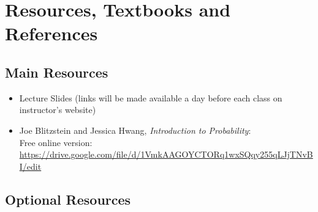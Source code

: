 \documentclass[11pt]{article}
\begin{document}
\section{Resources, Textbooks and References}

\subsection{Main Resources}

\begin{itemize}[leftmargin=*]

    \item Lecture Slides (links will be made available a day before each class on instructor's website)

    \item Joe Blitzstein and Jessica Hwang, 
    \textit{Introduction to Probability}:\\
    Free online version:\\
    \url{https://drive.google.com/file/d/1VmkAAGOYCTORq1wxSQqy255qLJjTNvBI/edit}


    
\end{itemize}



\subsection{Optional Resources}
\end{document}
